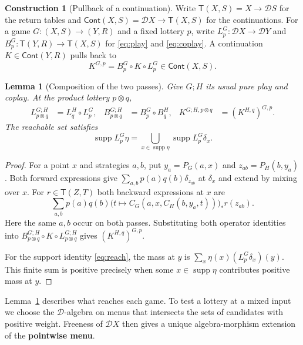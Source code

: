 \documentclass[11pt,a4paper]{article}
\newtheorem{lemma}[theorem]{Lemma}
\theoremstyle{definition}
\newtheorem*{construction}{Construction}
\newcommand{\D}{\mathcal D}
\newcommand{\supp}{\operatorname{supp}}
\begin{document}
\begin{construction}[Pullback of a continuation]
    Write $\mathsf T(X,S)=X\to\D S$ for the return tables and $\mathsf{Cont}(X,S)=\D X\to\mathsf T(X,S)$ for the continuations. For a game $G:(X,S)\to(Y,R)$ and a fixed lottery $p$, write $L_p^G:\D X\to\D Y$ and $B_p^G:\mathsf T(Y,R)\to\mathsf T(X,S)$ for \eqref{eq:play} and \eqref{eq:coplay}. A continuation $K\in\mathsf{Cont}(Y,R)$ pulls back to
    \[
        K^{G,p}=B_p^G\circ K\circ L_p^G\in\mathsf{Cont}(X,S).
    \]
\end{construction}

\begin{lemma}[Composition of the two passes]\label{lem:passes}
    Give $G;H$ its usual pure play and coplay. At the product lottery $p\otimes q$,
    \begin{align*}
        L_{p\otimes q}^{G;H}&=L_q^H\circ L_p^G,&
        B_{p\otimes q}^{G;H}&=B_p^G\circ B_q^H,&
        K^{G;H,p\otimes q}&=(K^{H,q})^{G,p}.
    \end{align*}
    The reachable set satisfies
    \begin{equation}
        \supp L_p^G\eta
        =\bigcup_{x\in\supp\eta}\supp L_p^G\delta_x .
        \label{eq:reach}
    \end{equation}
\end{lemma}
\begin{proof}
    For a point $x$ and strategies $a,b$, put $y_a=P_G(a,x)$ and $z_{ab}=P_H(b,y_a)$. Both forward expressions give $\sum_{a,b}p(a)q(b)\delta_{z_{ab}}$ at $\delta_x$ and extend by mixing over $x$. For $r\in\mathsf T(Z,T)$ both backward expressions at $x$ are
    \[
        \sum_{a,b}p(a)q(b)
        \bigl(t\mapsto C_G(a,x,C_H(b,y_a,t))\bigr)_* r(z_{ab}).
    \]
    Here the same $a,b$ occur on both passes. Substituting both operator identities into $B_{p\otimes q}^{G;H}\circ K\circ L_{p\otimes q}^{G;H}$ gives $(K^{H,q})^{G,p}$.

    For the support identity \eqref{eq:reach}, the mass at $y$ is $\sum_x\eta(x)(L_p^G\delta_x)(y)$. This finite sum is positive precisely when some $x\in\supp\eta$ contributes positive mass at $y$.
\end{proof}

Lemma~\ref{lem:passes} describes what reaches each game. To test a lottery at a mixed input we choose the $\D$-algebra on menus that intersects the sets of candidates with positive weight. Freeness of $\D X$ then gives a unique algebra-morphism extension of the \textbf{pointwise menu}.
\end{document}
